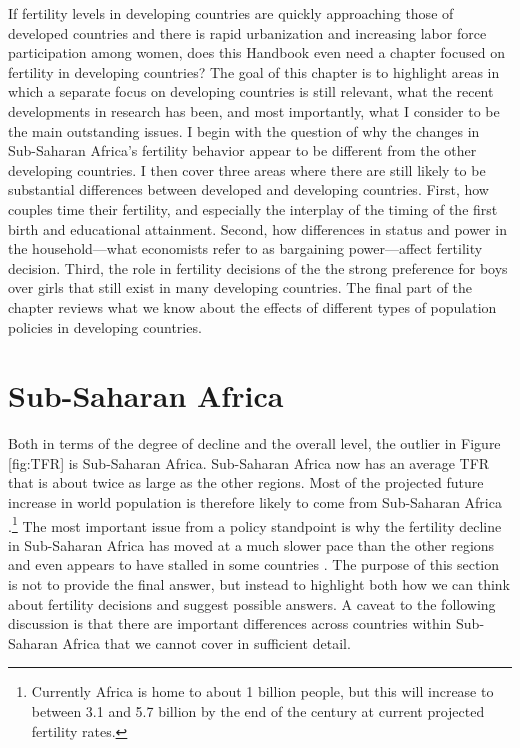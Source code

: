 If fertility levels in developing countries are quickly approaching those of developed countries and there is rapid urbanization and increasing labor force participation among women, does this Handbook even need a chapter focused on fertility in developing countries? The goal of this chapter is to highlight areas in which a separate focus on developing countries is still relevant, what the recent developments in research has been, and most importantly, what I consider to be the main outstanding issues. I begin with the question of why the changes in Sub-Saharan Africa's fertility behavior appear to be different from the other developing countries. I then cover three areas where there are still likely to be substantial differences between developed and developing countries. First, how couples time their fertility, and especially the interplay of the timing of the first birth and educational attainment. Second, how differences in status and power in the household---what economists refer to as bargaining power---affect fertility decision. Third, the role in fertility decisions of the the strong preference for boys over girls that still exist in many developing countries. The final part of the chapter reviews what we know about the effects of different types of population policies in developing countries.

\section{Sub-Saharan Africa}\label{sub-saharan-africa}

Both in terms of the degree of decline and the overall level, the outlier in Figure {[}fig:TFR{]} is Sub-Saharan Africa. Sub-Saharan Africa now has an average TFR that is about twice as large as the other regions. Most of the projected future increase in world population is therefore likely to come from Sub-Saharan Africa \citep{Gerland2014}.\footnote{Currently Africa is home to about 1 billion people, but this will increase to between 3.1 and 5.7 billion by the end of the century at current projected fertility rates.} The most important issue from a policy standpoint is why the fertility decline in Sub-Saharan Africa has moved at a much slower pace than the other regions and even appears to have stalled in some countries \citep{Ainsworth1996a,Singh2017}. The purpose of this section is not to provide the final answer, but instead to highlight both how we can think about fertility decisions and suggest possible answers. A caveat to the following discussion is that there are important differences across countries within Sub-Saharan Africa that we cannot cover in sufficient detail.

